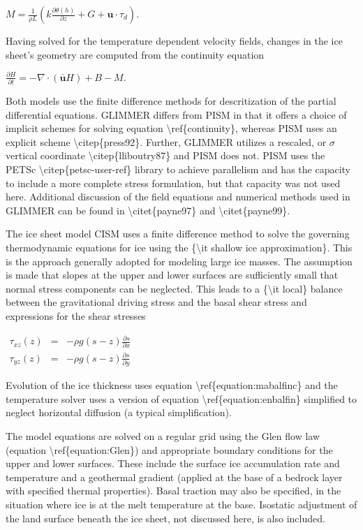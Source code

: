 $
M = \frac{1}{\rho L} \left ( k \frac{\partial
\theta(h)}{\partial z} + G + \mathbf{u} \cdot \tau_d \right ).
$

Having solved for the temperature dependent velocity fields, changes in
the ice sheet's geometry are computed from the continuity equation

$
\frac{\partial H}{\partial t} = - \nabla \cdot (\mathbf{\bar u} H) + B - M.
$

Both models use the finite difference methods for descritization of the
partial differential equations. GLIMMER differs from PISM in that it
offers a choice of implicit schemes for solving equation
\textbackslash{}ref\{continuity\}, whereas PISM uses an explicit scheme
\textbackslash{}citep\{press92\}. Further, GLIMMER utilizes a rescaled,
or $\sigma$ vertical coordinate \textbackslash{}citep\{lliboutry87\} and
PISM does not. PISM uses the PETSc
\textbackslash{}citep\{petsc-user-ref\} library to achieve parallelism
and has the capacity to include a more complete stress formulation, but
that capacity was not used here. Additional discussion of the field
equations and numerical methods used in GLIMMER can be found in
\textbackslash{}citet\{payne97\} and \textbackslash{}citet\{payne99\}.

The ice sheet model CISM uses a finite difference method to solve the
governing thermodynamic equations for ice using the \{\textbackslash{}it
shallow ice approximation\}. This is the approach generally adopted for
modeling large ice masses. The assumption is made that slopes at the
upper and lower surfaces are sufficiently small that normal stress
components can be neglected. This leads to a \{\textbackslash{}it
local\} balance between the gravitational driving stress and the basal
shear stress and expressions for the shear stresses

$\begin{matrix}
\tau_{xz}(z)&=&-\rho g \left(s - z \right) \frac{\partial s}{\partial x}  \\
\tau_{yz}(z)&=&-\rho g \left(s - z \right) \frac{\partial s}{\partial y}
\end{matrix}$

Evolution of the ice thickness uses equation
\textbackslash{}ref\{equation:mabalfinc\} and the temperature solver
uses a version of equation \textbackslash{}ref\{equation:enbalfin\}
simplified to neglect horizontal diffusion (a typical simplification).

The model equations are solved on a regular grid using the Glen flow law
(equation \textbackslash{}ref\{equation:Glen\}) and appropriate boundary
conditions for the upper and lower surfaces. These include the surface
ice accumulation rate and temperature and a geothermal gradient (applied
at the base of a bedrock layer with specified thermal properties). Basal
traction may also be specified, in the situation where ice is at the
melt temperature at the base. Isostatic adjustment of the land surface
beneath the ice sheet, not discussed here, is also included.

